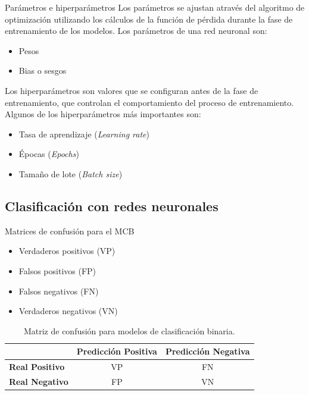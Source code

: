 \begin{frame}{Parámetros e hiperparámetros}
Los parámetros se ajustan através del algoritmo de optimización utilizando los cálculos de la función de pérdida durante la fase de entrenamiento de los modelos. Los parámetros de una red neuronal son:
\begin{itemize}
	\item Pesos
	\item Bias o sesgos
\end{itemize}

Los hiperparámetros son valores que se configuran antes de la fase de entrenamiento, que controlan el comportamiento del proceso de entrenamiento. Algunos de los hiperparámetros más importantes son:
\begin{itemize}
	\item Tasa de aprendizaje (\textit{Learning rate})
	\item Épocas (\textit{Epochs})
	\item Tamaño de lote (\textit{Batch size})
\end{itemize}
\end{frame}


\subsection{Clasificación con redes neuronales}
\begin{frame}{Matrices de confusión para el MCB}
\begin{itemize}
	\item \small Verdaderos positivos (VP)
    \item \small Falsos positivos (FP)
    \item \small Falsos negativos (FN)
    \item \small Verdaderos negativos (VN)
\end{itemize}

\begin{table}[H]
\centering
\begin{tabular}{|l|c|c|}
\hline
 & \textbf{Predicción Positiva} & \textbf{Predicción Negativa} \\ \hline
\textbf{Real Positivo} & VP & FN \\ \hline
\textbf{Real Negativo} & FP & VN \\ \hline
\end{tabular}
\caption{Matriz de confusión para modelos de clasificación binaria.}
\label{tab:confusion_matrix}
\end{table}
\end{frame}

